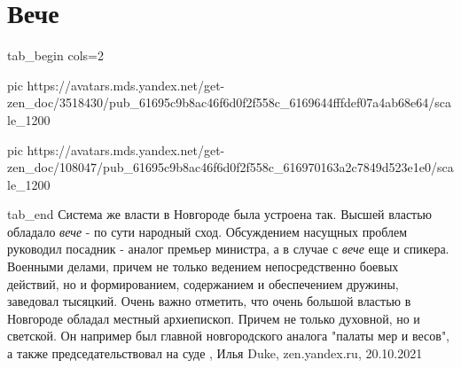  
 
 
 
 
\chapter{Вече}


\ifcmt
  tab_begin cols=2

     pic https://avatars.mds.yandex.net/get-zen_doc/3518430/pub_61695c9b8ac46f6d0f2f558c_6169644fffdef07a4ab68e64/scale_1200

     pic https://avatars.mds.yandex.net/get-zen_doc/108047/pub_61695c9b8ac46f6d0f2f558c_616970163a2c7849d523e1e0/scale_1200

  tab_end
\fi
Система же власти в Новгороде была устроена так. Высшей властью обладало \emph{вече} -
по сути народный сход. Обсуждением насущных проблем руководил посадник - аналог
премьер министра, а в случае с \emph{вече} еще и спикера. Военными делами, причем не
только ведением непосредственно боевых действий, но и формированием,
содержанием и обеспечением дружины, заведовал тысяцкий. Очень важно отметить,
что очень большой властью в Новгороде обладал местный архиепископ. Причем не
только духовной, но и светской. Он например был главной новгородского аналога
"палаты мер и весов", а также председательствовал на суде
, Илья Duke, zen.yandex.ru, 20.10.2021
